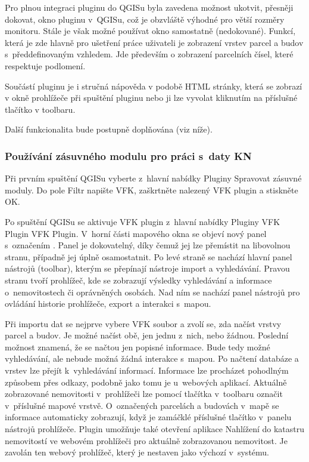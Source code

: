 \documentclass[a4paper,12pt]{article}
\begin{document}
Pro plnou integraci pluginu do QGISu byla zavedena možnost ukotvit, přesněji dokovat, okno pluginu v~QGISu, což je obzvláště výhodné pro větší rozměry monitoru.
Stále je však možné používat okno samostatně (nedokované).
Funkcí, která je zde hlavně pro ušetření práce uživateli je zobrazení vrstev parcel a budov s~předdefinovaným vzhledem.
Jde především o zobrazení parcelních čísel, které respektuje podlomení.

Součástí pluginu je i stručná nápověda v podobě HTML stránky, která se zobrazí v okně prohlížeče při spuštění pluginu nebo ji lze vyvolat kliknutím na příslušné tlačítko v toolbaru.

Další funkcionalita bude postupně doplňována (viz níže).


\subsubsection{Používání zásuvného modulu pro práci s~daty KN}
Při prvním spuštění QGISu vyberte z~hlavní nabídky Pluginy \textrightarrow{} Spravovat zásuvné moduly.
Do pole Filtr napište VFK, zaškrtněte nalezený VFK plugin a stiskněte OK.

Po spuštění QGISu se aktivuje VFK plugin z~hlavní nabídky Pluginy \textrightarrow{} VFK Plugin \textrightarrow{} VFK Plugin.
V~horní části mapového okna se objeví nový panel s~označením .
Panel je dokovatelný, díky čemuž jej lze přemístit na libovolnou stranu, případně jej úplně osamostatnit.
Po levé straně se nachází hlavní panel nástrojů (toolbar), kterým se přepínají nástroje import a vyhledávání.
Pravou stranu tvoří prohlížeč, kde se zobrazují výsledky vyhledávání a informace o~nemovitostech či oprávněných osobách.
Nad ním se nachází panel nástrojů pro ovládání historie prohlížeče, export a interakci s~mapou.

Při importu dat se nejprve vybere VFK soubor a zvolí se, zda načíst vrstvy parcel a budov.
Je možné načíst obě, jen jednu z~nich, nebo žádnou.
Poslední možnost znamená, že se načtou jen popisné informace.
Bude tedy možné vyhledávání, ale nebude možná žádná interakce s~mapou.
Po načtení databáze a vrstev lze přejít k~vyhledávání informací.
Informace lze procházet pohodlným způsobem přes odkazy, podobně jako tomu je u~webových aplikací.
Aktuálně zobrazované nemovitosti v~prohlížeči lze pomocí tlačítka v~toolbaru označit v~příslušné mapové vrstvě.
O~označených parcelách a budovách v~mapě se informace automaticky zobrazují, když je zamáčklé příslušné tlačítko v~panelu nástrojů prohlížeče.
Plugin umožňuje také otevření aplikace Nahlížení do katastru nemovitostí ve webovém prohlížeči pro aktuálně zobrazovanou nemovitost.
Je zavolán ten webový prohlížeč, který je nestaven jako výchozí v~systému.
\end{document}
